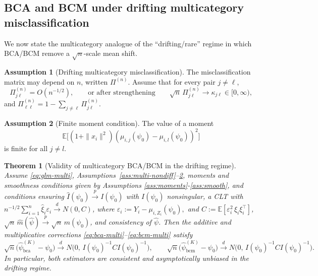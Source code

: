 \documentclass[11pt]{article}
\newtheorem{theorem}{Theorem}
\theoremstyle{definition}
\newtheorem{assumption}{Assumption}
\theoremstyle{remark}
\newcommand{\E}{\mathbb{E}}
\newcommand{\toP}{\xrightarrow{\,p\,}}
\newcommand{\tod}{\xrightarrow{\,d\,}}
\begin{document}
\subsection{BCA and BCM under drifting multicategory misclassification}

We now state the multicategory analogue of the ``drifting/rare'' regime in which BCA/BCM remove a
$\sqrt{n}$-scale mean shift.

\begin{assumption}[Drifting multicategory misclassification]\label{ass:multi-drift}
The misclassification matrix may depend on $n$, written $\Pi^{(n)}$. Assume that
for every pair $j\neq \ell$,
\[
\Pi^{(n)}_{j\ell}=O(n^{-1/2}),
\qquad\text{or after strengthening}\qquad
\sqrt{n}\,\Pi^{(n)}_{j\ell}\to \kappa_{j\ell}\in[0,\infty),
\]
and $\Pi^{(n)}_{\ell\ell}=1-\sum_{j\neq \ell}\Pi^{(n)}_{j\ell}$.
\end{assumption}
\begin{assumption}[Finite moment condition]\label{ass:multi-moment}
    The value of a moment 
    \[\E \big[(1+\|x_i\|^2)(\mu_{i,j}(\psi_0)-\mu_{i,l}(\psi_0))^2\big]\]
    is finite for all $j\neq l$.
\end{assumption}

\begin{theorem}[Validity of multicategory BCA/BCM in the drifting regime]\label{thm:multi-bc}
Assume \eqref{eq:glm-multi}, Assumptions~\ref{ass:multi-nondiff}--\ref{ass:multi-moment}, moments and smoothness conditions given by Assumptions \ref{ass:moments}-\ref{ass:smooth}, and conditions ensuring $\hat I(\psi_0)\toP I(\psi_0)$ with $I(\psi_0)$ nonsingular, a CLT with
$n^{-1/2}\sum_{i=1}^n \hat\xi_i\varepsilon_i \tod N(0, C)$, where $\varepsilon_i:=Y_i-\mu_{i,Z_i}(\psi_0),$ and $C:=\E[\varepsilon_i^2\,\xi_i\xi_i^\top]$, 
$\sqrt{n}\,\hat m(\hat\psi)\toP \sqrt{n}\,m(\psi_0)$, and consistency of $\hat\psi$.
Then the additive and multiplicative corrections \eqref{eq:bca-multi}--\eqref{eq:bcm-multi} satisfy
\[
\sqrt{n}\big(\hat\psi_{\mathrm{bca}}^{(K)}-\psi_0\big)\tod N\big(0,\,I(\psi_0)^{-1}CI(\psi_0)^{-1}\big),
\qquad
\sqrt{n}\big(\hat\psi_{\mathrm{bcm}}^{(K)}-\psi_0\big)\tod N\big(0,\,I(\psi_0)^{-1}CI(\psi_0)^{-1}\big).
\]
In particular, both estimators are consistent and asymptotically unbiased in the drifting regime.
\end{theorem}
\end{document}
